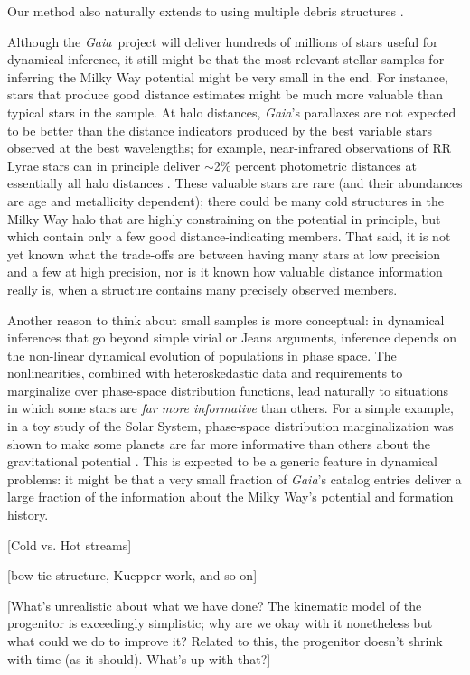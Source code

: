 \documentclass[letterpaper,12pt,preprint]{aastex}
\newcommand{\project}[1]{\textsl{#1}}
\newcommand{\gaia}{\project{Gaia}}
\begin{document}
Our method also naturally extends to using multiple debris structures \citep[see][who illustrate the power of using multiple streams to simultaneously constrain the potential]{deg14}.

Although the \gaia\, project will deliver hundreds of millions of stars useful for dynamical inference,
  it still might be that the most relevant stellar samples for inferring the Milky Way potential might be very small in the end.
For instance, stars that produce good distance estimates might be much more valuable than typical stars in the sample.
At halo distances, \gaia's parallaxes are not expected to be better than the distance indicators produced by the best
  variable stars observed at the best wavelengths; for example, near-infrared observations of RR Lyrae stars
  can in principle deliver $\sim$2\% percent photometric distances at essentially all halo distances \citep{madore12}.
These valuable stars are rare (and their abundances are age and metallicity dependent);
  there could be many cold structures in the Milky Way halo that are highly constraining
  on the potential in principle, but which contain only a few good distance-indicating members.
That said, it is not yet known what the trade-offs are between having many stars at low precision and a few at high precision,
  nor is it known how valuable distance information really is, when a structure contains many precisely observed members.

Another reason to think about small samples is more conceptual:
in dynamical inferences that go beyond simple virial or Jeans arguments,
  inference depends on the non-linear dynamical evolution of populations in phase space.
The nonlinearities, combined with heteroskedastic data and requirements to marginalize over phase-space distribution functions,
  lead naturally to situations in which some stars are \emph{far more informative} than others.
For a simple example, in a toy study of the Solar System,
  phase-space distribution marginalization was shown to make some planets are far more informative than others
  about the gravitational potential \citep{bovy10}.
This is expected to be a generic feature in dynamical problems:
  it might be that a very small fraction of \gaia's catalog entries
  deliver a large fraction of the information about the Milky Way's potential and formation history.

[Cold vs. Hot streams]

[bow-tie structure, Kuepper work, and so on]

[What's unrealistic about what we have done?  The kinematic model of
  the progenitor is exceedingly simplistic; why are we okay with it
  nonetheless but what could we do to improve it?  Related to this,
  the progenitor doesn't shrink with time (as it should).  What's up
  with that?]
\end{document}
